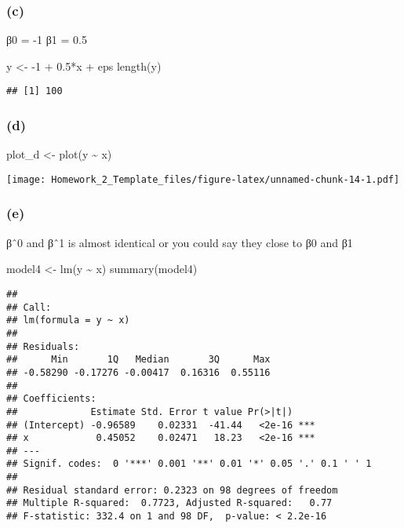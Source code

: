 \documentclass[
]{article}
\newenvironment{Shaded}{\begin{snugshade}}{\end{snugshade}}
\newcommand{\DecValTok}[1]{\textcolor[rgb]{0.00,0.00,0.81}{#1}}
\newcommand{\FloatTok}[1]{\textcolor[rgb]{0.00,0.00,0.81}{#1}}
\newcommand{\FunctionTok}[1]{\textcolor[rgb]{0.00,0.00,0.00}{#1}}
\newcommand{\NormalTok}[1]{#1}
\newcommand{\OtherTok}[1]{\textcolor[rgb]{0.56,0.35,0.01}{#1}}
\newcommand{\SpecialCharTok}[1]{\textcolor[rgb]{0.00,0.00,0.00}{#1}}
\begin{document}
\hypertarget{c-2}{%
\subsubsection{(c)}\label{c-2}}

β0 = -1 β1 = 0.5

\begin{Shaded}
\begin{Highlighting}[]
\NormalTok{y }\OtherTok{\textless{}{-}} \SpecialCharTok{{-}}\DecValTok{1} \SpecialCharTok{+} \FloatTok{0.5}\SpecialCharTok{*}\NormalTok{x }\SpecialCharTok{+}\NormalTok{ eps}
\FunctionTok{length}\NormalTok{(y)}
\end{Highlighting}
\end{Shaded}

\begin{verbatim}
## [1] 100
\end{verbatim}

\hypertarget{d-1}{%
\subsubsection{(d)}\label{d-1}}

\begin{Shaded}
\begin{Highlighting}[]
\NormalTok{plot\_d }\OtherTok{\textless{}{-}} \FunctionTok{plot}\NormalTok{(y }\SpecialCharTok{\textasciitilde{}}\NormalTok{ x)}
\end{Highlighting}
\end{Shaded}

\texttt{[image: Homework\_2\_Template\_files/figure-latex/unnamed-chunk-14-1.pdf]}

\hypertarget{e-1}{%
\subsubsection{(e)}\label{e-1}}

βˆ0 and βˆ1 is almost identical or you could say they close to β0 and β1

\begin{Shaded}
\begin{Highlighting}[]
\NormalTok{model4 }\OtherTok{\textless{}{-}} \FunctionTok{lm}\NormalTok{(y }\SpecialCharTok{\textasciitilde{}}\NormalTok{ x)}
\FunctionTok{summary}\NormalTok{(model4)}
\end{Highlighting}
\end{Shaded}

\begin{verbatim}
## 
## Call:
## lm(formula = y ~ x)
## 
## Residuals:
##      Min       1Q   Median       3Q      Max 
## -0.58290 -0.17276 -0.00417  0.16316  0.55116 
## 
## Coefficients:
##             Estimate Std. Error t value Pr(>|t|)    
## (Intercept) -0.96589    0.02331  -41.44   <2e-16 ***
## x            0.45052    0.02471   18.23   <2e-16 ***
## ---
## Signif. codes:  0 '***' 0.001 '**' 0.01 '*' 0.05 '.' 0.1 ' ' 1
## 
## Residual standard error: 0.2323 on 98 degrees of freedom
## Multiple R-squared:  0.7723, Adjusted R-squared:   0.77 
## F-statistic: 332.4 on 1 and 98 DF,  p-value: < 2.2e-16
\end{verbatim}
\end{document}
